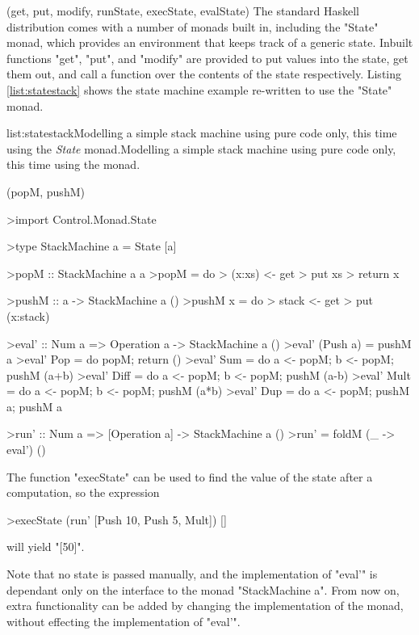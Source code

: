 \functions(get, put, modify, runState, execState, evalState)
The standard Haskell distribution comes with a number of monads built in, including the "State" monad, which provides an environment that keeps track of a generic state. Inbuilt functions "get", "put", and "modify" are provided to put values into the state, get them out, and call a function over the contents of the state respectively. Listing \ref{list:statestack} shows the state machine example re-written to use the "State" monad.

\vspace{-0.5em}
\begin{listing}{list:statestack}{Modelling a simple stack machine using pure code only, this time using the \emph{State} monad.}{Modelling a simple stack machine using pure code only, this time using the  monad.}{}
\end{listing}\vspace{-1.5em}

\functions(popM, pushM)
\begin{haskell}

>import Control.Monad.State

>type StackMachine a = State [a]

>popM :: StackMachine a a
>popM = do
>  (x:xs) <- get
>  put xs
>  return x

>pushM :: a -> StackMachine a ()
>pushM x = do
>  stack <- get
>  put (x:stack)

>eval' :: Num a => Operation a -> StackMachine a ()
>eval' (Push a) = pushM a
>eval' Pop  = do popM; return ()
>eval' Sum  = do a <- popM; b <- popM; pushM (a+b)
>eval' Diff = do a <- popM; b <- popM; pushM (a-b)
>eval' Mult = do a <- popM; b <- popM; pushM (a*b)
>eval' Dup  = do a <- popM; pushM a; pushM a

>run' :: Num a => [Operation a] -> StackMachine a ()
>run' = foldM (\_ -> eval') ()

\end{haskell}
\noindent The function "execState" can be used to find the value of the state after a computation, so the expression

\begin{haskell}

>execState (run' [Push 10, Push 5, Mult]) []

\end{haskell}
\noindent will yield "[50]".

Note that no state is passed manually, and the implementation of "eval'" is dependant only on the interface to the monad "StackMachine a". From now on, extra functionality can be added by changing the implementation of the monad, without effecting the implementation of "eval'". 

